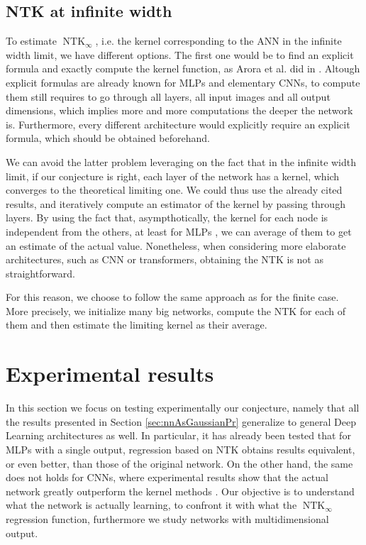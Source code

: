 \documentclass[11pt,notitlepage]{article}
\numberwithin{equation}{section}
\DeclareMathOperator{\NTK}{NTK}
\theoremstyle{remark}
\theoremstyle{definition}
\begin{document}
	\subsection{NTK at infinite width}\label{subsec:infinteImpl}
	To estimate $\NTK_\infty$, i.e. the kernel corresponding to the ANN in the infinite width limit, we have different options.
	The first one would be to find an explicit formula and exactly compute the kernel function, as Arora et al. did in \cite{arora2019exact}.
	Altough explicit formulas are already known for MLPs and elementary CNNs, to compute them still requires to go through all layers, all input images and all output dimensions, which implies more and more computations the deeper the network  is.
	Furthermore, every different architecture would explicitly require an explicit formula, which should be obtained beforehand.
	
	We can avoid the latter problem leveraging on the fact that in the infinite width limit, if our conjecture is right, each layer of the network has a kernel, which converges to the theoretical limiting one.
	We could thus use the already cited results, and iteratively compute an estimator of the kernel by passing through layers.
	By using the fact that, asympthotically, the kernel for each node is independent from the others, at least for MLPs \cite{jacot2018neural}, we can average of them to get an estimate of the actual value.
	Nonetheless, when considering more elaborate architectures, such as CNN or transformers, obtaining the NTK is not as straightforward.
	
	For this reason, we choose to follow the same approach as for the finite case.
	More precisely, we initialize many big networks, compute the NTK for each of them and then estimate the limiting kernel as their average.
	
	\section{Experimental results}\label{sec:experiments}
	
	In this section we focus on testing experimentally our conjecture, namely that all the results presented in Section \ref{sec:nnAsGaussianPr} generalize to general Deep Learning architectures as well.
	In particular, it has already been tested that for MLPs with a single output, regression based on NTK obtains results equivalent, or even better, than those of the original network.
	On the other hand, the same does not holds for CNNs, where experimental results show that the actual network greatly outperform the kernel methods \cite{arora2019exact}.
	Our objective is to understand what the network is actually learning, to confront it with what the $\NTK_\infty$ regression function, furthermore we study networks with multidimensional output.
	
\end{document}
